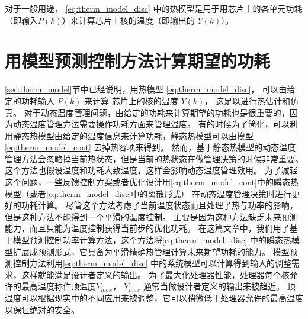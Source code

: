 对于一般用途， \eqref{eq:therm_model_disc} 中的热模型是用于用芯片上的各单元功耗（即输入$P(k)$）来计算芯片上核的温度（即输出的 $Y(k)$）。

\section{用模型预测控制方法计算期望的功耗}\label{sec:mpc}

\ref{sec:therm_model}节中已经说明，用热模型 \eqref{eq:therm_model_disc}， 可以由给定的功耗输入 $P(k)$ 来计算
芯片上的核的温度 $Y(k)$， 这足以进行热估计和仿真。
对于动态温度管理问题，由给定的功耗来计算期望的功耗也是很重要的，因为动态温度管理方法需要操作功耗方面来管理温度。
有的时候为了简化，可以利用静态热模型由给定的温度信息来计算功耗，静态热模型可以由模型 \eqref{eq:therm_model_cont} 去掉热容项来得到。
然而，基于静态热模型的动态温度管理方法会忽略掉当前热状态，但是当前的热状态在做管理决策的时候非常重要。
这个方法也假设温度和功耗大致温度，这样会影响动态温度管理效用。
为了减轻这个问题，一些反馈控制方案或者优化设计用\eqref{eq:therm_model_cont}中的瞬态热模型（或者\eqref{eq:therm_model_disc}中的离散形式）
在动态温度管理决策时进行更好的功耗计算。
尽管这个方法考虑了当前温度状态而且处理了热与功率的影响，但是这种方法不能得到一个平滑的温度控制。
主要是因为这种方法缺乏未来预测能力，而且只能为温度控制获得当前步的优化功耗。
在这篇文章中，我们用了基于模型预测控制功率计算方法，这个方法将\eqref{eq:therm_model_disc} 中的瞬态热模型扩展成预测形式，它具备为平滑精确热管理计算未来期望功耗的能力。
模型预测控制方法利用\eqref{eq:therm_model_disc} 中的系统模型可以计算得到输入的调整需求，这样就能满足设计者定义的输出。
为了最大化处理器性能，处理器每个核允许的最高温度称作顶温度$Y_{max}$， $Y_{max}$ 通常当做设计者定义的输出来被趋近。
顶温度可以根据现实中的不同应用来被调整，它可以稍微低于处理器允许的最高温度以保证绝对的安全。

